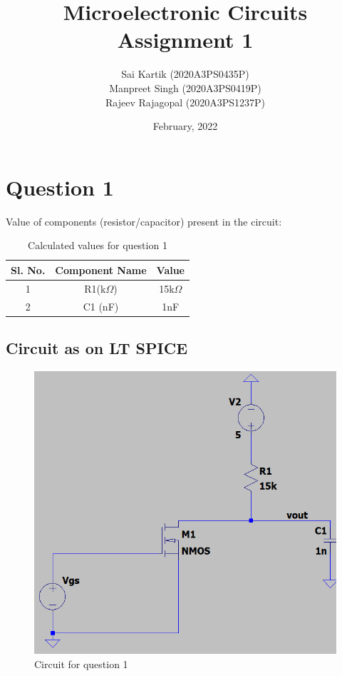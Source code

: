 \documentclass[titlepage]{article}
\title{Microelectronic Circuits Assignment 1}
\author{Sai Kartik (2020A3PS0435P)\\ Manpreet Singh (2020A3PS0419P)\\ Rajeev Rajagopal (2020A3PS1237P)}
\date{February, 2022}
\begin{document}
\maketitle
\tableofcontents
\listoffigures
\listoftables
\newpage
{}
\setcounter{page}{1}
\section{Question 1}
Value of components (resistor/capacitor) present in the circuit:
\begin{table}[ht]
    \centering
    \caption{Calculated values for question 1}
    \begin{tabular}{|c | c | c|}
        \hline
        Sl. No. & Component Name & Value       \\
        \hline
        1       & R1(k$\Omega$)  & 15k$\Omega$ \\ %
        2       & C1 (nF)        & 1nF         \\ %
        \hline
    \end{tabular}
    \label{tab:values1}
\end{table}
\subsection{Circuit as on LT SPICE}
\begin{figure}[ht]
    \centering
    \includegraphics[scale=0.50]{resources/q1.png}
    \caption{Circuit for question 1}
    \label{fig:circuit1}
\end{figure}
\newpage
\end{document}
